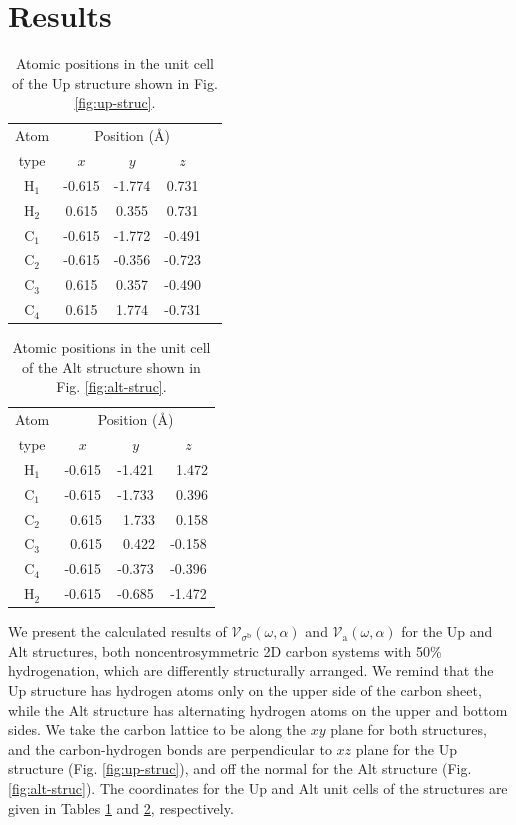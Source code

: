 \documentclass[floatfix,prb,aps,superscriptaddress,showpacs,11pt,preprint,letterpaper]{revtex4}
\begin{document}
\section{Results}
\label{sec:results}

\begin{table}[t]
\center
\begin{tabular}{ccccc}\\
\hline
\quad Atom \qquad & \multicolumn{3}{c}{Position (\AA)} \\
\cline{2-4}
\quad type \qquad & $x$ & $y$ & $z$  \\
\hline
H$_1$ & -0.615 & -1.774 &  0.731 \\
H$_2$ &  0.615 &  0.355 &  0.731 \\
C$_1$ & -0.615 & -1.772 & -0.491 \\
C$_2$ & -0.615 & -0.356 & -0.723 \\
C$_3$ &  0.615 &  0.357 & -0.490 \\
C$_4$ &  0.615 &  1.774 & -0.731 \\
\hline
\end{tabular}
\caption{
Atomic positions in the unit cell of the Up structure shown
in Fig. \ref{fig:up-struc}. 
}
\label{tab:up-unitcell}
\end{table}
\begin{table}[t]
\center
\begin{tabular}{cccc}\\
\hline
\quad Atom \qquad & \multicolumn{3}{c}{Position (\AA)} \\
\cline{2-4}
\quad type \qquad & $x$ & $y$ & $z$  \\
\hline
H$_1$ &  -0.615 &  -1.421 & \ 1.472 \\
C$_1$ &  -0.615 &  -1.733 & \ 0.396 \\
C$_2$ & \ 0.615 & \ 1.733 & \ 0.158 \\
C$_3$ & \ 0.615 & \ 0.422 &  -0.158 \\
C$_4$ &  -0.615 &  -0.373 &  -0.396 \\
H$_2$ &  -0.615 &  -0.685 &  -1.472 \\
\hline
\end{tabular}
\caption{
Atomic positions in the unit cell of the Alt structure
 shown in Fig. \ref{fig:alt-struc}. 
}
\label{tab:alt-unitcell}
\end{table}

We present the calculated results of
$\mathcal{V}_{\sigma^{\mathrm{b}}}(\omega,\alpha)$ and
$\mathcal{V}_{\mathrm{a}}(\omega,\alpha)$ for the Up  and
Alt structures, both noncentrosymmetric 2D carbon systems with
50\% hydrogenation, which are differently structurally arranged. We remind that
the Up structure has hydrogen atoms only on the upper side of the carbon sheet,
while the Alt structure has alternating hydrogen atoms on the upper and bottom
sides. We take the carbon lattice to be along the $xy$ plane for both
structures, and the carbon-hydrogen bonds are
perpendicular to  $xz$ plane for the Up structure
(Fig. \ref{fig:up-struc}),
 and off the normal for the Alt structure 
(Fig. \ref{fig:alt-struc}). The coordinates for the Up and Alt unit cells of the
structures are given in Tables \ref{tab:up-unitcell} and 
\ref{tab:alt-unitcell}, respectively.
\end{document}
